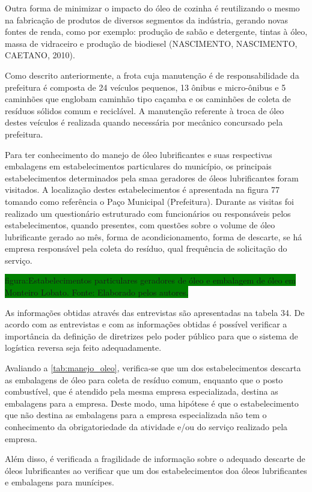 \begin{description}
	Outra forma de minimizar o impacto do óleo de cozinha é reutilizando o mesmo na fabricação de produtos de diversos segmentos da indústria, gerando novas fontes de renda, como por exemplo: produção de sabão e detergente, tintas à óleo, massa de vidraceiro e produção de biodiesel (NASCIMENTO, NASCIMENTO, CAETANO, 2010).
	
	Como descrito anteriormente, a frota cuja manutenção é de responsabilidade da prefeitura é composta de 24 veículos pequenos, 13 	ônibus e micro-ônibus e 5 caminhões que englobam caminhão tipo caçamba e os caminhões de coleta de resíduos sólidos comum e reciclável. A manutenção referente à troca de óleo destes veículos é realizada quando necessária por mecânico concursado pela prefeitura.
	
	Para ter conhecimento do manejo de óleo lubrificantes e suas respectivas embalagens em estabelecimentos particulares do município, os principais estabelecimentos determinados pela \gls{smaa} geradores de óleos lubrificantes foram visitados. A localização destes estabelecimentos é apresentada na figura 77 tomando como referência o Paço Municipal (Prefeitura). Durante as visitas foi realizado um questionário estruturado com funcionários ou responsáveis pelos estabelecimentos, quando presentes, com questões sobre o volume de óleo lubrificante gerado ao mês, forma de acondicionamento, forma de descarte, se há empresa responsável pela coleta do resíduo, qual frequência de solicitação do serviço.
	
	\colorbox{green}{figura:Estabelecimentos particulares geradores de óleo e embalagem de óleo em Monteiro Lobato. Fonte: Elaborado pelos autores.}
	
	As informações obtidas através das entrevistas são apresentadas na tabela 34. De acordo com as entrevistas e com as informações obtidas é possível verificar a importância da definição de diretrizes pelo poder público para que o sistema de logística reversa seja feito adequadamente.
	
	Avaliando a \autoref{tab:manejo_oleo}, verifica-se que um dos estabelecimentos descarta as embalagens de óleo para coleta de resíduo comum, enquanto que o posto combustível, que é atendido pela mesma empresa especializada, destina as embalagens para a empresa. Deste modo, uma hipótese é que o estabelecimento que não destina as embalagens para a empresa especializada não tem o conhecimento da obrigatoriedade da atividade e/ou do serviço realizado pela empresa.
	
	Além disso, é verificada a fragilidade de informação sobre o adequado descarte de óleos lubrificantes ao verificar que um dos estabelecimentos doa óleos lubrificantes e embalagens para munícipes.
	

\end{description}
